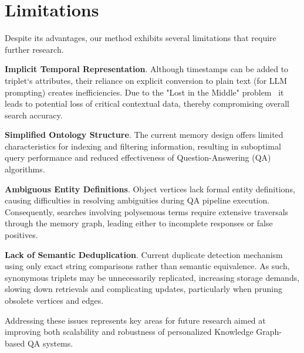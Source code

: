 \section{Limitations}

Despite its advantages, our method exhibits several limitations that require further research.

\textbf{Implicit Temporal Representation}. Although timestamps can be added to triplet`s attributes, their reliance on explicit conversion to plain text (for LLM prompting)  creates inefficiencies. Due to the "Lost in the Middle" problem~\cite{liu-etal-2024-lost} it leads to potential loss of critical contextual data, thereby compromising overall search accuracy.

\textbf{Simplified Ontology Structure}. The current memory design offers limited characteristics for indexing and filtering information, resulting in suboptimal query performance and reduced effectiveness of Question-Answering (QA) algorithms.

\textbf{Ambiguous Entity Definitions}. Object vertices lack formal entity definitions, causing difficulties in resolving ambiguities during QA pipeline execution. Consequently, searches involving polysemous terms require extensive traversals through the memory graph, leading either to incomplete responses or false positives.

\textbf{Lack of Semantic Deduplication}. Current duplicate detection mechanism using only exact string comparisons rather than semantic equivalence. As such, synonymous triplets may be unnecessarily replicated, increasing storage demands, slowing down retrievals and complicating updates, particularly when pruning obsolete vertices and edges.
   
Addressing these issues represents key areas for future research aimed at improving both scalability and robustness of personalized Knowledge Graph-based QA systems.



